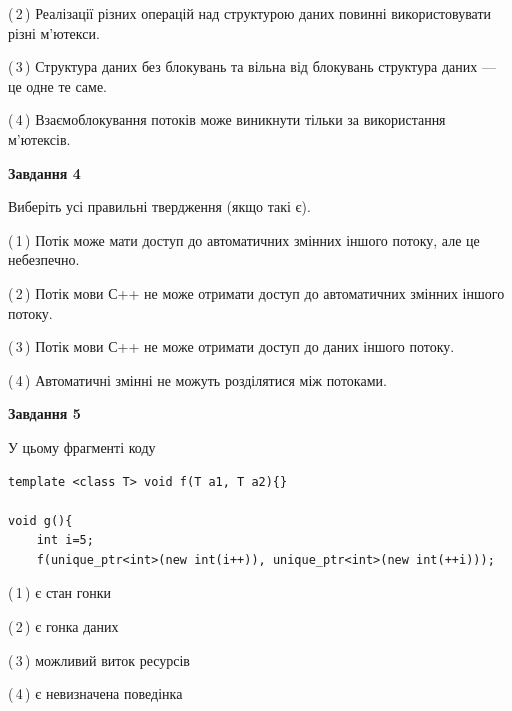 \documentclass[12pt, ukrainian]{article}
\begin{document}
\begin {large}
{(\,2\,) Реалізації різних операцій над структурою даних повинні використовувати різні м’ютекси.%

(\,3\,) Структура даних без блокувань та вільна від блокувань структура даних --- це одне те саме.%

(\,4\,) Взаємоблокування потоків може виникнути тільки за використання м’ютексів.%



\begin{center}
\textbf{Завдання 4}
\end{center}
Виберіть усі правильні твердження (якщо такі є).\par
\vspace{2mm}

(\,1\,) Потік може мати доступ до автоматичних змінних іншого потоку, але це небезпечно.%

(\,2\,) Потік мови С++ не може отримати доступ до автоматичних змінних іншого потоку.%

(\,3\,) Потік мови С++ не може отримати доступ до даних іншого потоку.%

(\,4\,) Автоматичні змінні не можуть розділятися між потоками.%



\begin{center}
\textbf{Завдання 5}
\end{center}
У цьому фрагменті коду
\begin{verbatim}
template <class T> void f(T a1, T a2){}

void g(){
    int i=5;
    f(unique_ptr<int>(new int(i++)), unique_ptr<int>(new int(++i)));
\end{verbatim}

(\,1\,) є стан гонки%

(\,2\,) є гонка даних%

(\,3\,) можливий виток ресурсів%

(\,4\,) є невизначена поведінка%


}
\end {large}
\end{document}
